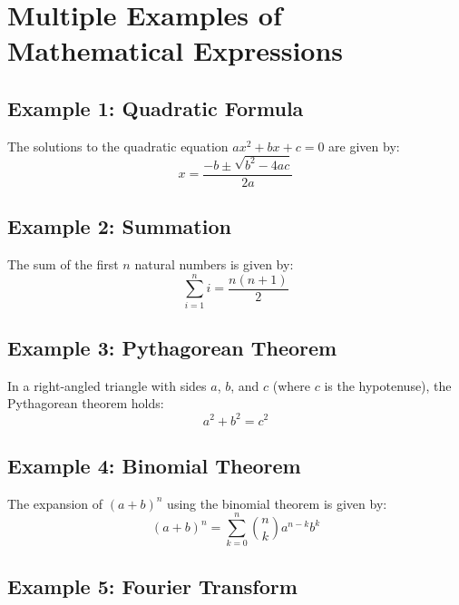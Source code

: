 \documentclass{article}
\begin{document}
    \section*{Multiple Examples of Mathematical Expressions}

    \subsection*{Example 1: Quadratic Formula}

    The solutions to the quadratic equation $ax^2 + bx + c = 0$ are given by:
    \begin{equation}
        x = \frac{-b \pm \sqrt{b^2 - 4ac}}{2a}
    \end{equation}

    \subsection*{Example 2: Summation}

    The sum of the first $n$ natural numbers is given by:
    \begin{equation}
        \sum_{i=1}^{n} i = \frac{n(n+1)}{2}
    \end{equation}

    \subsection*{Example 3: Pythagorean Theorem}

    In a right-angled triangle with sides $a$, $b$, and $c$ (where $c$ is the hypotenuse), the Pythagorean theorem holds:
    \begin{equation}
        a^2 + b^2 = c^2
    \end{equation}

    \subsection*{Example 4: Binomial Theorem}

    The expansion of $(a + b)^n$ using the binomial theorem is given by:
    \begin{equation}
    (a + b)^n = \sum_{k=0}^{n} \binom{n}{k} a^{n-k} b^k
    \end{equation}

    \subsection*{Example 5: Fourier Transform}
\end{document}
